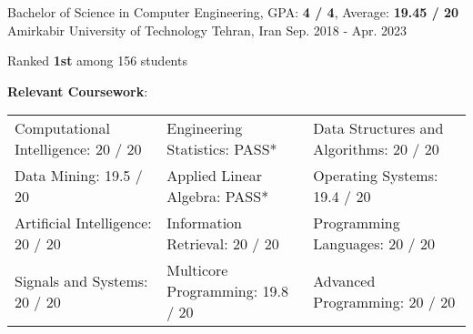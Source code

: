\begin{cventries}
  \cventry
    {Bachelor of Science in Computer Engineering, GPA: \textbf{4 / 4}, Average: \textbf{19.45 / 20}} %
    {Amirkabir University of Technology} %
    {Tehran, Iran} %
    {Sep. 2018 - Apr. 2023} %
    {
      \begin{cvitems}
        \item{Ranked \textbf{1st} among 156 students}
        \item{
          \textbf{Relevant Coursework}:
          \smallskip
          \begin{adjustwidth}{4mm}{}
            \begin{tabular}{l@{\hskip 5mm}l@{\hskip 5mm}l}
              Computational Intelligence: 20 / 20 & Engineering Statistics: PASS*    & Data Structures and Algorithms: 20 / 20 \\
              Data Mining: 19.5 / 20              & Applied Linear Algebra: PASS*    & Operating Systems: 19.4 / 20            \\
              Artificial Intelligence: 20 / 20    & Information Retrieval: 20 / 20   & Programming Languages: 20 / 20          \\
              Signals and Systems: 20 / 20        & Multicore Programming: 19.8 / 20 & Advanced Programming: 20 / 20  

\end{tabular}
\end{adjustwidth}}
\end{cvitems}}
\end{cventries}
